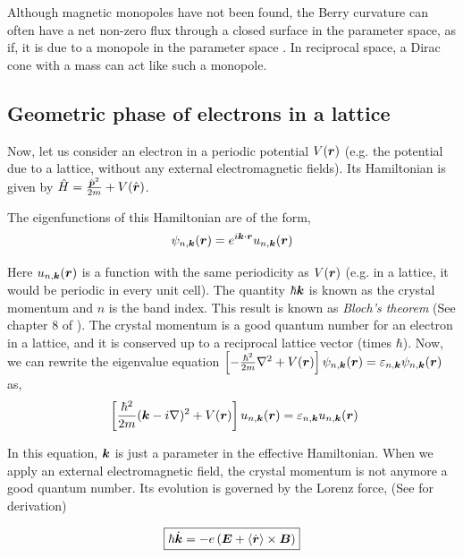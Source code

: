 \documentclass{report}
\renewcommand\vec[1]{\ensuremath\boldsymbol{#1}} %
\begin{document}
Although magnetic monopoles have not been found, the Berry curvature can often have a net non-zero flux through a closed surface in the parameter space, as if, it is due to a monopole in the parameter space \cite{tong2016lectures}. In reciprocal space, a Dirac cone with a mass can act like such a monopole.


\subsection{Geometric phase of electrons in a lattice}
Now, let us consider an electron in a periodic potential $V(\vec{r})$ (e.g. the potential due to a lattice, without any external electromagnetic fields). Its Hamiltonian is given by $\hat{H} = \frac{{\hat{\vec{p}}}^2}{2 m} + V(\hat{\vec{r}})$.

The eigenfunctions of this Hamiltonian are of the form,
$$\psi_{n, \vec{k}} (\vec{r}) = e^{i \vec{k}\cdot \vec{r}} u_{n,\vec{k}} (\vec{r})$$

Here $u_{n,\vec{k}} (\vec{r})$ is a function with the same periodicity as $V(\vec{r})$ (e.g. in a lattice, it would be periodic in every unit cell). The quantity $\hbar \vec{k}$ is known as the crystal momentum and $n$ is the band index. This result is known as \textit{Bloch's theorem} (See chapter 8 of \cite{book:AshcroftMermin76}). The crystal momentum is a good quantum number for an electron in a lattice, and it is conserved up to a reciprocal lattice vector (times $\hbar$).
Now, we can rewrite the eigenvalue equation $\left[-\frac{\hbar^2}{2m}\nabla^2 + V(\vec{r}) \right] \psi_{n, \vec{k}}(\vec{r}) = \varepsilon_{n,\vec{k}} \psi_{n, \vec{k}}(\vec{r})$ as,
\begin{equation}~\label{Eq:effectiveBlochEquation}
	\left[\frac{\hbar^2}{2m}(\vec{k} - i \nabla)^2 + V(\vec{r}) \right]u_{n,\vec{k}} (\vec{r}) = \varepsilon_{n,\vec{k}} u_{n,\vec{k}} (\vec{r})
\end{equation}

In this equation, $\vec{k}$ is just a parameter in the effective Hamiltonian. When we apply an external electromagnetic field, the crystal momentum is not anymore a good quantum number. Its evolution is governed by the Lorenz force, (See \cite{ralph2020berry} for derivation)

\begin{equation} \label{Eq:evolution-of-k}
	\boxed{\hbar \dot{\vec{k}} = -e\left(\vec{E} + \langle\dot{\vec{r}}\rangle \times \vec{B} \right)}
\end{equation}
\end{document}
